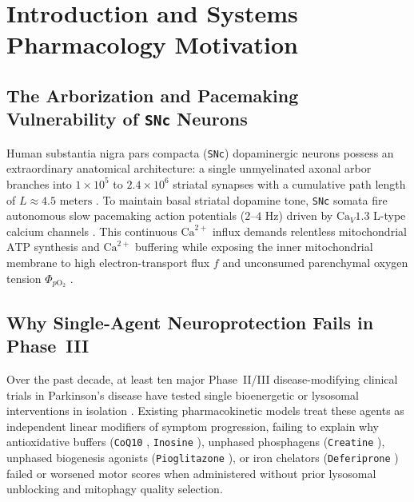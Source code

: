 \documentclass[11pt]{article}
\theoremstyle{plain}
\begin{document}
\section{Introduction and Systems Pharmacology Motivation}

\subsection{The Arborization and Pacemaking Vulnerability of \texttt{SNc} Neurons}
Human substantia nigra pars compacta (\texttt{SNc}) dopaminergic neurons possess an extraordinary anatomical architecture: a single unmyelinated axonal arbor branches into $1\times 10^5$ to $2.4\times 10^6$ striatal synapses with a cumulative path length of $L \approx 4.5\text{ meters}$ \cite{bolam2012living,surmeier2017selective}. To maintain basal striatal dopamine tone, \texttt{SNc} somata fire autonomous slow pacemaking action potentials ($2\text{--}4\text{ Hz}$) driven by $\mathrm{Ca}_V1.3$ L-type calcium channels \cite{surmeier2017selective}. This continuous $\mathrm{Ca}^{2+}$ influx demands relentless mitochondrial $\mathrm{ATP}$ synthesis and $\mathrm{Ca}^{2+}$ buffering while exposing the inner mitochondrial membrane to high electron-transport flux $f$ and unconsumed parenchymal oxygen tension $\Phi_{p\mathrm{O}_2}$ \cite{marutani2025hypoxia}.

\subsection{Why Single-Agent Neuroprotection Fails in Phase~III}
Over the past decade, at least ten major Phase~II/III disease-modifying clinical trials in Parkinson's disease have tested single bioenergetic or lysosomal interventions in isolation \cite{qe32014coq10,netpd2015creatine,surepd32021inosine,steadypd2020isradipine,devos2022fairpark,fszone2015pioglitazone,brakedal2022nadpark,mullin2020ambroxol,payne2023udca,meissner2024lixipark}. Existing pharmacokinetic models treat these agents as independent linear modifiers of symptom progression, failing to explain why antioxidative buffers (\texttt{CoQ10} \cite{qe32014coq10}, \texttt{Inosine} \cite{surepd32021inosine}), unphased phosphagens (\texttt{Creatine} \cite{netpd2015creatine}), unphased biogenesis agonists (\texttt{Pioglitazone} \cite{fszone2015pioglitazone}), or iron chelators (\texttt{Deferiprone} \cite{devos2022fairpark}) failed or worsened motor scores when administered without prior lysosomal unblocking and mitophagy quality selection.
\end{document}
